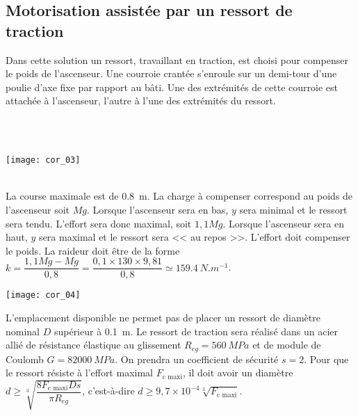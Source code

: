 \subsection*{Motorisation assistée par un ressort de traction}
Dans cette solution un ressort, travaillant en traction, est choisi pour compenser
le poids de l’ascenseur. Une courroie crantée s’enroule sur un demi-tour
d’une poulie d’axe fixe par rapport au bâti. Une des extrémités de cette courroie
est attachée à l’ascenseur, l’autre à l’une des extrémités du ressort.

\ifprof
\begin{corrige}~\\
~\\
\begin{center}
\texttt{[image: cor\_03]}
\end{center}

\end{corrige}
\else
\fi



\ifprof
\begin{corrige}~\\
La course maximale est de \SI{0,8}{m}. La charge à compenser correspond au poids de l'ascenseur soit $Mg$. 
Lorsque l'ascenseur sera en bas, $y$ sera minimal et le ressort sera tendu. L'effort sera donc maximal, soit $1,1 Mg$.
Lorsque l'ascenseur sera en haut, $y$ sera maximal et le ressort sera  << au repos >>. L'effort doit compenser le poids.
La raideur doit être de la forme $k=\dfrac{1,1Mg - Mg}{0,8} = \dfrac{0,1 \times 130 \times 9,81 }{0,8}\simeq \SI{159,4}{N.m^{-1}}$.
\begin{center}
\texttt{[image: cor\_04]}
\end{center}
\end{corrige}
\else
\fi

\ifprof
\else
L’emplacement disponible ne permet pas de placer un ressort de diamètre
nominal $D$ supérieur à \SI{0,1}{m}. Le ressort de traction sera réalisé dans un acier
allié de résistance élastique au glissement $R_{eg}=\SI{560}{MPa}$ et de module de Coulomb $G=\SI{82000}{MPa}$. On prendra un coefficient de sécurité $s=2$. Pour que le
ressort résiste à l’effort maximal $F_{\text{c maxi}}$, il doit avoir un diamètre
$d\geq \sqrt[3]{\dfrac{8 F_{\text{c maxi}} D s}{\pi R_{eg}}}$, 
c'est-à-dire $d\geq 9,7 \times 10^{-4}\sqrt[3]{F_{\text{c maxi}}}$.

